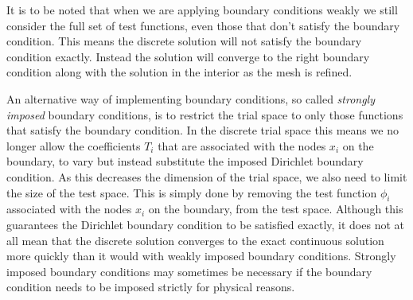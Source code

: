 It is to be noted that when we are applying boundary conditions weakly we still consider the full 
set of test functions, even those that don't satisfy the boundary condition. This means the discrete
solution will not satisfy the boundary condition exactly. Instead the solution will converge 
to the right boundary condition along with the solution in the interior as the mesh is refined.

An alternative way of implementing boundary conditions, so called \emph{strongly imposed}
boundary conditions, is to restrict the trial space to only those functions that satisfy 
the boundary condition. In the discrete trial space this means 
we no longer allow the coefficients $T_i$ that are associated with the nodes $x_i$ on the boundary,
to vary but instead substitute the imposed Dirichlet boundary condition. As this decreases the 
dimension of the trial space, we also need to limit the size of the test space. This is simply 
done by removing the test function $\phi_i$ associated with the nodes $x_i$ on the boundary, from the
test space. Although this guarantees the Dirichlet boundary condition to be satisfied exactly, 
it does not at all mean that the discrete solution converges to the exact continuous solution 
more quickly than it would with weakly imposed boundary conditions. Strongly imposed boundary 
conditions may sometimes be necessary if the boundary condition needs to be imposed strictly 
for physical reasons.

